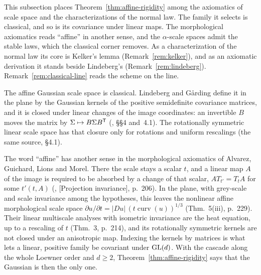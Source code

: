 This subsection places Theorem~\ref{thm:affine-rigidity} among the axiomatics of scale space and the
characterizations of the normal law. The family it selects is classical, and so is its covariance
under linear maps. The morphological axiomatics reads ``affine'' in another sense, and the
$\alpha$-scale spaces admit the stable laws, which the classical corner removes. As a
characterization of the normal law its core is Kelker's lemma (Remark~\ref{rem:kelker}), and as an
axiomatic derivation it stands beside Lindeberg's (Remark~\ref{rem:lindeberg}).
Remark~\ref{rem:classical-line} reads the scheme on the line.

The affine Gaussian scale space is classical. Lindeberg and G\aa{}rding define it in the plane by
the Gaussian kernels of the positive semidefinite covariance matrices, and it is closed under linear changes of
the image coordinates: an invertible $B$ moves the matrix by $\Sigma \mapsto B\Sigma B^{\mathsf{T}}$
(, \S\S4 and~4.1). The rotationally symmetric
linear scale space has that closure only for rotations and uniform rescalings (the same source, \S4.1).

The word ``affine'' has another sense in the morphological axiomatics of Alvarez, Guichard, Lions
and Morel. There the scale stays a scalar $t$, and a linear map $A$ of the image is required to be
absorbed by a change of that scalar, $AT_{t'} = T_tA$ for some $t'(t, A)$
(, [Projection invariance], p.~206). In the plane, with grey-scale and
scale invariance among the hypotheses, this leaves the nonlinear affine morphological scale space
$\partial u/\partial t = |Du|\,(t\operatorname{curv}(u))^{1/3}$ (Thm.~5(iii), p.~229). Their
linear multiscale analyses with isometric invariance are the heat equation, up to a rescaling of
$t$ (Thm.~3, p.~214), and its rotationally symmetric kernels are not closed under an anisotropic
map. Indexing the kernels by matrices is what lets a linear, positive family be covariant under
$\mathrm{GL}(d)$. With the cascade along the whole Loewner order and $d \ge 2$,
Theorem~\ref{thm:affine-rigidity} says that the Gaussian is then the only one.

